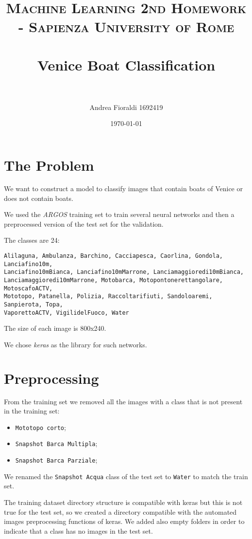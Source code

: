 \documentclass[paper=a4, fontsize=11pt]{scrartcl} %
\title{    
\normalfont \normalsize 
\textsc{Machine Learning 2nd Homework - Sapienza University of Rome} \\ [25pt] %
\horrule{0.5pt} \\[0.4cm] %
\huge Venice Boat Classification \\ %
\horrule{2pt} \\[0.5cm] %
}
\author{Andrea Fioraldi 1692419} %
\date{\normalsize\today} %
\numberwithin{equation}{section} %
\numberwithin{figure}{section} %
\numberwithin{table}{section} %
\begin{document}
\maketitle %

\section*{The Problem}

We want to construct a model to classify images that contain boats of Venice or does not contain boats.

We used the {\em ARGOS} training set to train several neural networks and then a preprocessed version of the test set for the validation.

The classes are 24:

\begin{verbatim}
Alilaguna, Ambulanza, Barchino, Cacciapesca, Caorlina, Gondola, Lanciafino10m,
Lanciafino10mBianca, Lanciafino10mMarrone, Lanciamaggioredi10mBianca,
Lanciamaggioredi10mMarrone, Motobarca, Motopontonerettangolare, MotoscafoACTV,
Mototopo, Patanella, Polizia, Raccoltarifiuti, Sandoloaremi, Sanpierota, Topa,
VaporettoACTV, VigilidelFuoco, Water
\end{verbatim}

The size of each image is 800x240.

We chose {\em keras} as the library for such networks.

\section*{Preprocessing}

From the training set we removed all the images with a class that is not present in the training set:
\begin{itemize}
    \item \verb|Mototopo corto|;
    \item \verb|Snapshot Barca Multipla|;
    \item \verb|Snapshot Barca Parziale|;
\end{itemize}
We renamed the \verb|Snapshot Acqua| class of the test set to \verb|Water| to match the train set.

The training dataset directory structure is compatible with keras but this is not true for the test set, so we created a directory compatible with the automated images preprocessing functions of keras.
We added also empty folders in order to indicate that a class has no images in the test set.
\end{document}
